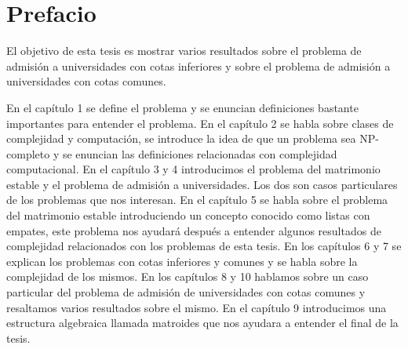 \documentclass[11pt, oneside]{book}
\begin{document}



\chapter*{Prefacio}

\pagestyle{plain}

El objetivo de esta tesis es mostrar varios resultados sobre el problema de admisión a universidades con cotas inferiores y sobre el problema de admisión a universidades con cotas comunes. 

En el capítulo 1 se define el problema y se enuncian definiciones bastante importantes para entender el problema. 
En el capítulo 2 se habla sobre clases de complejidad y computación, se introduce la idea de que un problema sea NP-completo y se enuncian las definiciones relacionadas con complejidad computacional.
En el capítulo 3 y 4  introducimos el problema del matrimonio estable y el problema de admisión a universidades. Los dos son casos particulares de los problemas que nos interesan. 
En el capítulo 5 se habla sobre el problema del matrimonio estable introduciendo un concepto conocido como listas con empates, este problema nos ayudará después a entender algunos resultados de complejidad relacionados con los problemas de esta tesis. 
En los capítulos 6 y 7 se explican los problemas con cotas inferiores y comunes y se habla sobre la complejidad de los mismos. 
En los capítulos 8 y 10 hablamos sobre un caso particular del problema de admisión de universidades con cotas comunes y resaltamos varios resultados sobre el mismo. 
En el capítulo 9 introducimos una estructura algebraica llamada matroides que nos ayudara a entender el final de la tesis. 
\end{document}
